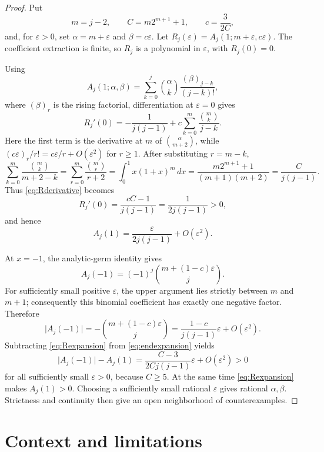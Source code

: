 \documentclass[a4paper]{amsart}
\theoremstyle{remark}
\begin{document}
\begin{proof}
Put
\[
 m=j-2,
 \qquad C=m2^{m+1}+1,
 \qquad c=\frac{3}{2C},
\]
and, for \(\varepsilon>0\), set \(\alpha=m+\varepsilon\) and
\(\beta=c\varepsilon\).  Let
\(R_j(\varepsilon)=A_j(1;m+\varepsilon,c\varepsilon)\).
The coefficient extraction is finite, so \(R_j\) is a polynomial in \(\varepsilon\), with \(R_j(0)=0\).

Using
\[
 A_j(1;\alpha,\beta)=
 \sum_{k=0}^{j}\binom{\alpha}{k}
 \frac{(\beta)_{j-k}}{(j-k)!},
\]
where \((\beta)_r\) is the rising factorial, differentiation at \(\varepsilon=0\) gives
\begin{equation}\label{eq:Rderivative}
 R_j'(0)=-\frac1{j(j-1)}
 +c\sum_{k=0}^{m}\frac{\binom mk}{j-k}.
\end{equation}
Here the first term is the derivative at \(m\) of \(\binom{\alpha}{m+2}\), while
\((c\varepsilon)_r/r!=c\varepsilon/r+O(\varepsilon^2)\) for \(r\geq1\).
After substituting \(r=m-k\),
\[
 \sum_{k=0}^{m}\frac{\binom mk}{m+2-k}
 =\sum_{r=0}^{m}\frac{\binom mr}{r+2}
 =\int_0^1x(1+x)^m\,dx
 =\frac{m2^{m+1}+1}{(m+1)(m+2)}
 =\frac{C}{j(j-1)}.
\]
Thus \eqref{eq:Rderivative} becomes
\[
 R_j'(0)=\frac{cC-1}{j(j-1)}=\frac1{2j(j-1)}>0,
\]
and hence
\begin{equation}\label{eq:Rexpansion}
 A_j(1)=\frac{\varepsilon}{2j(j-1)}+O(\varepsilon^2).
\end{equation}

At \(x=-1\), the analytic-germ identity gives
\[
 A_j(-1)=(-1)^j\binom{m+(1-c)\varepsilon}{j}.
\]
For sufficiently small positive \(\varepsilon\), the upper argument lies strictly between \(m\) and \(m+1\); consequently this binomial coefficient has exactly one negative factor.  Therefore
\begin{equation}\label{eq:endexpansion}
 \lvert A_j(-1)\rvert
 =-\binom{m+(1-c)\varepsilon}{j}
 =\frac{1-c}{j(j-1)}\varepsilon+O(\varepsilon^2).
\end{equation}
Subtracting \eqref{eq:Rexpansion} from \eqref{eq:endexpansion} yields
\[
 \lvert A_j(-1)\rvert-A_j(1)
 =\frac{C-3}{2Cj(j-1)}\varepsilon+O(\varepsilon^2)>0
\]
for all sufficiently small \(\varepsilon>0\), because \(C\geq5\).  At the same time \eqref{eq:Rexpansion} makes \(A_j(1)>0\).
Choosing a sufficiently small rational \(\varepsilon\) gives rational \(\alpha,\beta\).  Strictness and continuity then give an open neighborhood of counterexamples.
\end{proof}

\section{Context and limitations}
\end{document}
